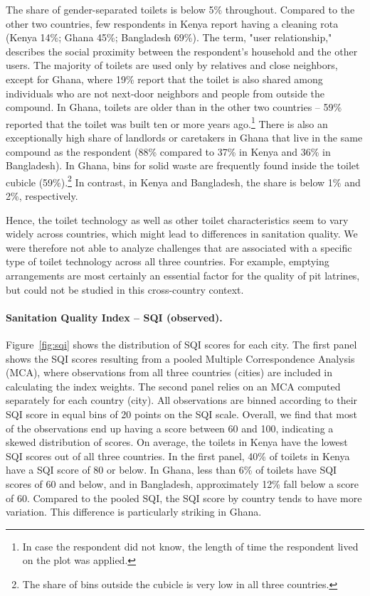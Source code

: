 \documentclass[natbib]{svjour3}                     %
\begin{document}
The share of gender-separated toilets is below 5\% throughout. Compared to the other two countries, few respondents in Kenya report having a cleaning rota (Kenya 14\%; Ghana 45\%; Bangladesh 69\%). The term, "user relationship," describes the social proximity between the respondent's household and the other users. The majority of toilets are used only by relatives and close neighbors, except for Ghana, where 19\% report that the toilet is also shared among individuals who are not next-door neighbors and people from outside the compound. In Ghana, toilets are older than in the other two countries -- 59\% reported that the toilet was built ten or more years ago.\footnote{In case the respondent did not know, the length of time the respondent lived on the plot was applied.} There is also an exceptionally high share of landlords or caretakers in Ghana that live in the same compound as the respondent (88\% compared to 37\% in Kenya and 36\% in Bangladesh). In Ghana, bins for solid waste are frequently found inside the toilet cubicle (59\%).\footnote{The share of bins outside the cubicle is very low in all three countries.} In contrast, in Kenya and Bangladesh, the share is below 1\% and 2\%, respectively.

Hence, the toilet technology as well as other toilet characteristics seem to vary widely across countries, which might lead to differences in sanitation quality. We were therefore not able to analyze challenges that are associated with a specific type of toilet technology across all three countries. For example, emptying arrangements are most certainly an essential factor for the quality of pit latrines, but could not be studied in this cross-country context.

\FloatBarrier
\paragraph{Sanitation Quality Index -- SQI (observed).}
Figure~\ref{fig:sqi} shows the distribution of SQI scores for each city. The first panel shows the SQI scores resulting from a pooled Multiple Correspondence Analysis (MCA), where observations from all three countries (cities) are included in calculating the index weights. The second panel relies on an MCA computed separately for each country (city). All observations are binned according to their SQI score in equal bins of 20 points on the SQI scale. Overall, we find that most of the observations end up having a score between 60 and 100, indicating a skewed distribution of scores. On average, the toilets in Kenya have the lowest SQI scores out of all three countries. In the first panel, 40\% of toilets in Kenya have a SQI score of 80 or below. In Ghana, less than 6\% of toilets have SQI scores of 60 and below, and in Bangladesh, approximately 12\% fall below a score of 60. Compared to the pooled SQI, the SQI score by country tends to have more variation. This difference is particularly striking in Ghana.
\end{document}
